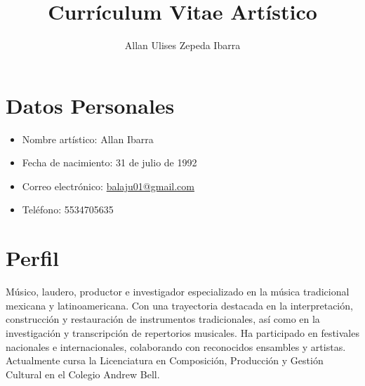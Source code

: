\documentclass{article}
\begin{document}
\title{Currículum Vitae Artístico}
\author{Allan Ulises Zepeda Ibarra}
\date{}
\maketitle

\section*{Datos Personales}
\begin{itemize}
    \item Nombre artístico: Allan Ibarra
    \item Fecha de nacimiento: 31 de julio de 1992
    \item Correo electrónico: \href{mailto:balaju01@gmail.com}{balaju01@gmail.com}
    \item Teléfono: 5534705635
\end{itemize}

\section*{Perfil}
Músico, laudero, productor e investigador especializado en la música tradicional mexicana y latinoamericana. Con una trayectoria destacada en la interpretación, construcción y restauración de instrumentos tradicionales, así como en la investigación y transcripción de repertorios musicales. Ha participado en festivales nacionales e internacionales, colaborando con reconocidos ensambles y artistas. Actualmente cursa la Licenciatura en Composición, Producción y Gestión Cultural en el Colegio Andrew Bell.
\end{document}
